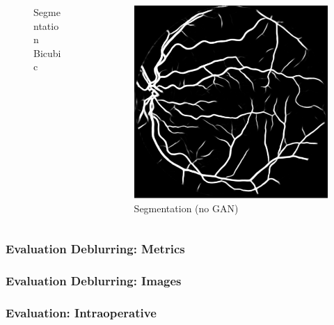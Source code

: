 \documentclass{beamer}
\begin{document}
\begin{frame}
\begin{columns}
\begin{column}{0.33\linewidth}
\begin{figure}[htb]
        \caption*{Segmentation Bicubic}
      \end{figure}
    \end{column}
  \begin{column}{0.33\linewidth}
      \centering
      \begin{figure}[htb]
        \centering
        \includegraphics[width=1.0\textwidth]{segmentation_nogan}
        \caption*{Segmentation (no GAN)}
      \end{figure}
    \end{column}
\end{columns}
\end{frame}

\begin{frame} \frametitle{Evaluation Deblurring: Metrics}
  
\end{frame}

\begin{frame} \frametitle{Evaluation Deblurring: Images}

\end{frame}


\begin{frame}
  \frametitle{Evaluation: Intraoperative}
  
\end{frame}
\end{document}

